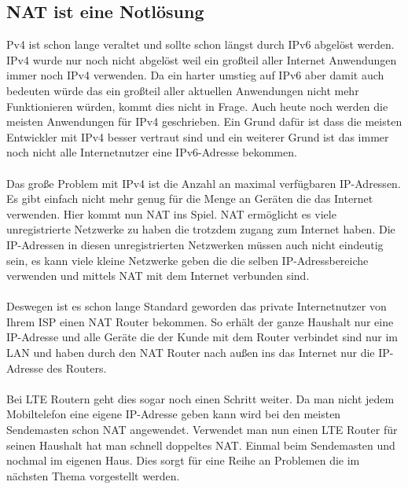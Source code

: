 \subsection{NAT ist eine Notlösung}
Pv4 ist schon lange veraltet und sollte schon längst durch IPv6 abgelöst werden. IPv4 wurde nur noch nicht abgelöst weil ein großteil aller Internet Anwendungen immer noch IPv4 verwenden. Da ein harter umstieg auf IPv6 aber damit auch bedeuten würde das ein großteil aller aktuellen Anwendungen nicht mehr Funktionieren würden, kommt dies nicht in Frage. Auch heute noch werden die meisten Anwendungen für IPv4 geschrieben. Ein Grund dafür ist dass die meisten Entwickler mit IPv4 besser vertraut sind und ein weiterer Grund ist das immer noch nicht alle Internetnutzer eine IPv6-Adresse bekommen.
\\\\
Das große Problem mit IPv4 ist die Anzahl an maximal verfügbaren IP-Adressen. Es gibt einfach nicht mehr genug für die Menge an Geräten die das Internet verwenden. 
Hier kommt nun NAT ins Spiel. NAT ermöglicht es viele unregistrierte Netzwerke zu haben die trotzdem zugang zum Internet haben. Die IP-Adressen in diesen unregistrierten Netzwerken müssen auch nicht eindeutig sein, es kann viele kleine Netzwerke geben die die selben IP-Adressbereiche verwenden und mittels NAT mit dem Internet verbunden sind.
\\\\
Deswegen ist es schon lange Standard geworden das private Internetnutzer von Ihrem ISP einen NAT Router bekommen. So erhält der ganze Haushalt nur eine IP-Adresse und alle Geräte die der Kunde mit dem Router verbindet sind nur im LAN und haben durch den NAT Router nach außen ins das Internet nur die IP-Adresse des Routers. 
\\\\
Bei LTE Routern geht dies sogar noch einen Schritt weiter. Da man nicht jedem Mobiltelefon eine eigene IP-Adresse geben kann wird bei den meisten Sendemasten schon NAT angewendet. Verwendet man nun einen LTE Router für seinen Haushalt hat man schnell doppeltes NAT. Einmal beim Sendemasten und nochmal im eigenen Haus. Dies sorgt für eine Reihe an Problemen die im nächsten Thema vorgestellt werden. 

